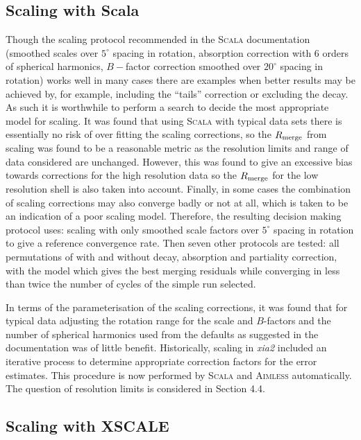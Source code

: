\documentclass[a4paper, 11pt]{article}
\begin{document}
\subsection{Scaling with Scala}

Though the scaling protocol recommended in the \textsc{Scala} documentation
(smoothed scales over $5^{\circ}$ spacing in rotation, absorption
correction with 6 orders of spherical harmonics, $B-$factor correction
smoothed over $20^{\circ}$ spacing in rotation) works well in many
cases there are examples when better results may be achieved by,
for example, including the ``tails'' correction or excluding the
decay. As such it is worthwhile to perform a search to decide the most
appropriate model for scaling. It was found that using \textsc{Scala}
with typical data sets there is essentially no risk of over fitting
the scaling corrections, so the $R_{\rm{merge}}$ from scaling was found to
be a reasonable metric as the resolution limits and range of data
considered are unchanged. However, this was found to give an excessive
bias towards corrections for the high resolution data so the
$R_{\rm{merge}}$ for the low
resolution shell is also taken into account. Finally, in
some cases the combination of scaling corrections may also converge
badly or not at all, which is taken to be an indication of a poor
scaling model. Therefore, the resulting decision making
protocol uses: scaling with only smoothed scale
factors over $5^{\circ}$ spacing in rotation to give a reference
convergence rate. Then seven other protocols are tested: 
all permutations of with and
without decay, absorption and partiality correction, with the model
which gives the best merging residuals while converging in less than
twice the number of cycles of the simple run selected. 

In terms of the parameterisation of the scaling
corrections, it was found that for
typical data adjusting the rotation range for the scale and
$B$-factors and the number of spherical harmonics used from the
defaults as suggested in the documentation was of little benefit.
Historically, scaling in \emph{xia2} included an iterative process to
determine appropriate correction factors for the error estimates. This
procedure is now performed by \textsc{Scala} and \textsc{Aimless} automatically.
The question of resolution limits is considered in Section 4.4.

\subsection{Scaling with XSCALE}
\end{document}
